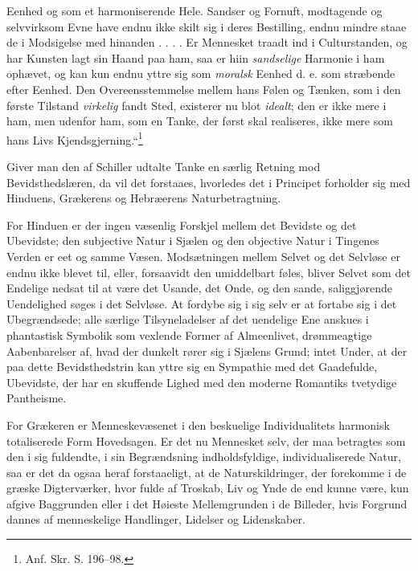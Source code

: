 \documentclass[12pt,a4paper]{book}
\begin{document}
Eenhed og som et harmoniserende Hele. Sandser
og Fornuft, modtagende og selvvirksom Evne have endnu ikke skilt sig i
deres Bestilling, endnu mindre staae de i Modsigelse med hinanden . . . .
Er Mennesket traadt ind i Culturstanden, og har Kunsten lagt sin Haand paa
ham, saa er hiin \emph{sandselige} Harmonie i ham ophævet, og kan kun
endnu yttre sig som \emph{moralsk} Eenhed d. e. som stræbende efter
Eenhed. Den Overeensstemmelse mellem hans Følen og Tænken, som i den
første Tilstand \emph{virkelig} fandt Sted, existerer nu blot
\emph{idealt}; den er ikke mere i ham, men udenfor ham, som en Tanke, der
først skal realiseres, ikke mere som hans Livs
Kjendsgjerning.“\footnote{Anf. Skr. S. 196--98.}

Giver man den af Schiller udtalte Tanke en særlig Retning mod
Bevidsthedslæren, da vil det forstaaes, hvorledes det i Principet forholder
sig med Hinduens, Grækerens og Hebræerens Naturbetragtning.

For Hinduen er der ingen væsenlig Forskjel mellem det Bevidste og det
Ubevidste; den subjective Natur i Sjælen og den objective Natur i Tingenes
Verden er eet og samme Væsen. Modsætningen mellem Selvet og det Selvløse
er endnu ikke blevet til, eller, forsaavidt den umiddelbart føles, bliver
Selvet som det Endelige nedsat til at være det Usande, det Onde, og den
sande, saliggjørende Uendelighed søges i det Selvløse. At fordybe sig i
sig selv er at fortabe sig i det Ubegrændsede; alle særlige
Tilsyneladelser af det uendelige Ene anskues i phantastisk Symbolik som
vexlende Former af Almeenlivet, drømmeagtige Aabenbarelser af, hvad der
dunkelt rører sig i Sjælens Grund; intet Under, at der paa dette
Bevidsthedstrin kan yttre sig en Sympathie med det Gaadefulde, Ubevidste,
der har en skuffende Lighed med den moderne Romantiks tvetydige
Pantheisme.

For Grækeren er Menneskevæsenet i den beskuelige Individualitets harmonisk
totaliserede Form Hovedsagen. Er
det nu Mennesket selv, der maa betragtes som den i sig fuldendte, i sin
Begrændsning indholdsfyldige, individualiserede Natur, saa er det da ogsaa
heraf forstaaeligt, at de Naturskildringer, der forekomme i de græske
Digterværker, hvor fulde af Troskab, Liv og Ynde de end kunne være, kun
afgive Baggrunden eller i det Høieste Mellemgrunden i de Billeder, hvis
Forgrund dannes af menneskelige Handlinger, Lidelser og Lidenskaber.
\end{document}
